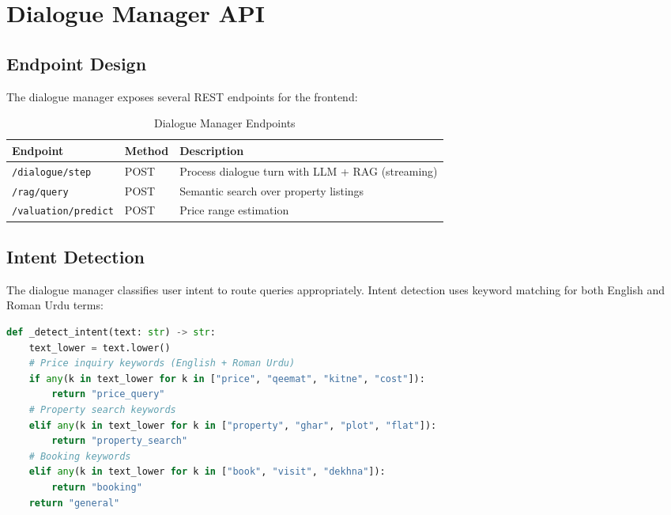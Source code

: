 \section{Dialogue Manager API}

\subsection{Endpoint Design}

The dialogue manager exposes several REST endpoints for the frontend:

\begin{table}[!htbp]
\centering
\caption{Dialogue Manager Endpoints}
\label{tab:endpoints}
\begin{tabular}{|l|l|p{6cm}|}
\hline
\textbf{Endpoint} & \textbf{Method} & \textbf{Description} \\ \hline
\texttt{/dialogue/step} & POST & Process dialogue turn with LLM + RAG (streaming) \\ \hline
\texttt{/rag/query} & POST & Semantic search over property listings \\ \hline
\texttt{/valuation/predict} & POST & Price range estimation \\ \hline
\end{tabular}
\end{table}

\subsection{Intent Detection}

The dialogue manager classifies user intent to route queries appropriately. Intent detection uses keyword matching for both English and Roman Urdu terms:

\begin{lstlisting}[language=Python, caption={Intent Detection Algorithm}, label=lst:intent]
def _detect_intent(text: str) -> str:
    text_lower = text.lower()
    # Price inquiry keywords (English + Roman Urdu)
    if any(k in text_lower for k in ["price", "qeemat", "kitne", "cost"]):
        return "price_query"
    # Property search keywords
    elif any(k in text_lower for k in ["property", "ghar", "plot", "flat"]):
        return "property_search"
    # Booking keywords
    elif any(k in text_lower for k in ["book", "visit", "dekhna"]):
        return "booking"
    return "general"
\end{lstlisting}


